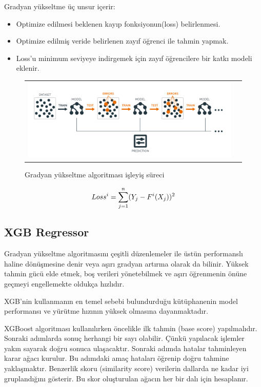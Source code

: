 \documentclass[conference]{IEEEtran}
\begin{document}
Gradyan yükseltme üç unsur içerir:

\begin{itemize}
\item Optimize edilmesi beklenen kayıp fonksiyonun(loss) belirlenmesi. 
\item Optimize edilmiş veride belirlenen zayıf öğrenci ile tahmin yapmak. 
\item Loss’u minimum seviyeye indirgemek için zayıf öğrencilere bir katkı modeli eklenir\cite{7}.
\end{itemize}

\begin{figure}[!h]
	\centering
	\begin{center}
		\begin{tabular}{cc}
			\includegraphics[scale=0.5]{pictures/pic_03.png}&
		\end{tabular}
	\end{center}
	\caption{Gradyan yükseltme algoritması işleyiş süreci\cite{16}}
	\label{fig:03}
\end{figure}

\begin{equation}
\label{eq:03}
\Large Loss^i=\sum_{j=1}^{n}(Y_{j}-F^i(X_{j}))^2
\end{equation}

\pagebreak
\subsection{\textbf{XGB Regressor}}
\quad Gradyan yükseltme algoritmasını çeşitli düzenlemeler ile üstün performanslı haline dönüşmesine denir veya aşırı gradyan artırma olarak da bilinir\cite{9}. Yüksek tahmin gücü elde etmek, boş verileri yönetebilmek ve aşırı öğrenmenin önüne geçmeyi engellemekte oldukça hızlıdır\cite{10}. 

\quad XGB’nin kullanmanın en temel sebebi bulundurduğu kütüphanenin model performansı ve yürütme hızının yüksek olmasına dayanmaktadır\cite{9}.

\quad XGBoost algoritması kullanılırken öncelikle ilk tahmin (base score) yapılmalıdır. Sonraki adımlarda sonuç herhangi bir sayı olabilir. Çünkü yapılacak işlemler yakın sayarak doğru sonuca ulaşacaktır. Sonraki adımda hatalar tahminleyen karar ağacı kurulur. Bu adımdaki amaç hataları öğrenip doğru tahmine yaklaşmaktır. Benzerlik skoru (similarity score) verilerin dallarda ne kadar iyi gruplandığını gösterir. Bu skor oluşturulan ağacın her bir dalı için hesaplanır. 
\end{document}
